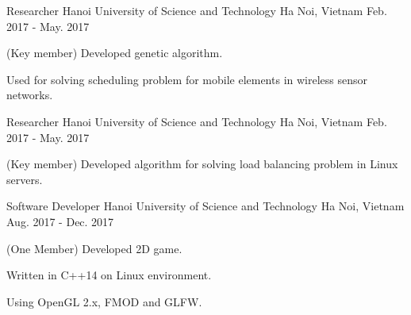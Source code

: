 


\begin{cventries}


\cventry
{Researcher} %
{Hanoi University of Science and Technology} %
{Ha Noi, Vietnam} %
{Feb. 2017 - May. 2017} %
{ %
\begin{cvitems}
\item{(Key member) Developed genetic algorithm.}
\item{Used for solving scheduling problem for mobile elements in wireless sensor networks.}
\end{cvitems}
}


\cventry
{Researcher} %
{Hanoi University of Science and Technology} %
{Ha Noi, Vietnam} %
{Feb. 2017 - May. 2017} %
{ %
\begin{cvitems}
\item {(Key member) Developed algorithm for solving load balancing problem in Linux servers.}
\end{cvitems}
}


\cventry
{Software Developer} %
{Hanoi University of Science and Technology} %
{Ha Noi, Vietnam} %
{Aug. 2017 - Dec. 2017} %
{ %
\begin{cvitems}
\item {(One Member) Developed 2D game.}
\item{Written in C++14 on Linux environment.}
\item {Using OpenGL 2.x, FMOD and GLFW.} 
\end{cvitems}
}



\end{cventries}

